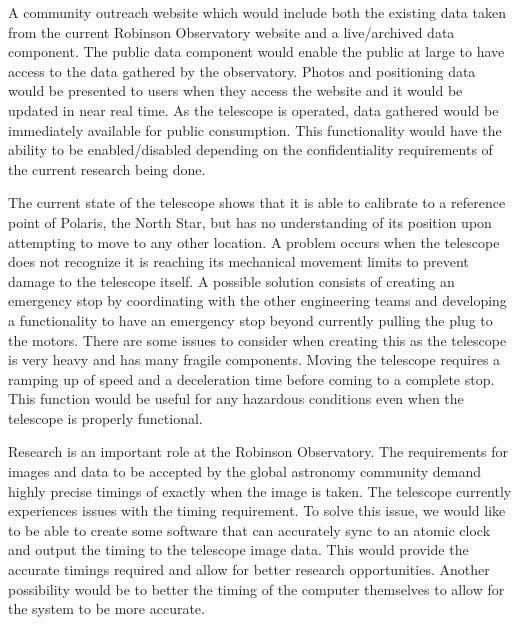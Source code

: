 \documentclass[12pt]{report}
\begin{document}
A community outreach website which would include both the existing data taken from the current Robinson Observatory website and a live/archived data component. The public data component would enable the public at large to have access to the data gathered by the observatory. Photos and positioning data would be presented to users when they access the website and it would be updated in near real time. As the telescope is operated, data gathered would be immediately available for public consumption. This functionality would have the ability to be enabled/disabled depending on the confidentiality requirements of the current research being done.

The current state of the telescope shows that it is able to calibrate to a reference point of Polaris, the North Star, but has no understanding of its position upon attempting to move to any other location.  A problem occurs when the telescope does not recognize it is reaching its mechanical movement limits to prevent damage to the telescope itself.  A possible solution consists of creating an emergency stop by coordinating with the other engineering teams and developing a functionality to have an emergency stop beyond currently pulling the plug to the motors.  There are some issues to consider when creating this as the telescope is very heavy and has many fragile components.  Moving the telescope requires a ramping up of speed and a deceleration time before coming to a complete stop.  This function would be useful for any hazardous conditions even when the telescope is properly functional.

Research is an important role at the Robinson Observatory.  The requirements for images and data to be accepted by the global astronomy community demand highly precise timings of exactly when the image is taken.  The telescope currently experiences issues with the timing requirement.  To solve this issue, we would like to be able to create some software that can accurately sync to an atomic clock and output the timing to the telescope image data.  This would provide the accurate timings required and allow for better research opportunities.  Another possibility would be to better the timing of the computer themselves to allow for the system to be more accurate.
\end{document}
